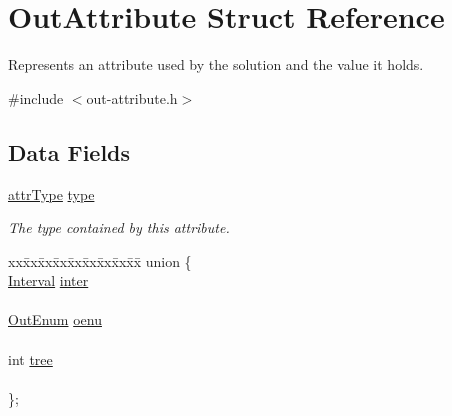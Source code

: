 \hypertarget{struct_out_attribute}{}\section{Out\+Attribute Struct Reference}
\label{struct_out_attribute}


Represents an attribute used by the solution and the value it holds.  




{\ttfamily \#include $<$out-\/attribute.\+h$>$}

\subsection*{Data Fields}
\begin{DoxyCompactItemize}
\item 
\hyperlink{attribute-types_8h_a1d7db01768b8c6ad96eb92c7f6a30f1b}{attr\+Type} \hyperlink{struct_out_attribute_a88721cff203fdfc8fcd285540041557f}{type}\hypertarget{struct_out_attribute_a88721cff203fdfc8fcd285540041557f}{}\label{struct_out_attribute_a88721cff203fdfc8fcd285540041557f}

\begin{DoxyCompactList}\small\item\em The type contained by this attribute. \end{DoxyCompactList}\item 
\begin{tabbing}
xx\=xx\=xx\=xx\=xx\=xx\=xx\=xx\=xx\=\kill
union \{\\
\>\hyperlink{struct_interval}{Interval} \hyperlink{struct_out_attribute_ad06263baef5945b27d0454c1f4c0610c}{inter}\\
\>\\
\>\hyperlink{struct_out_enum}{OutEnum} \hyperlink{struct_out_attribute_a4225b965bbcb80c0ee54c3724df694bb}{oenu}\\
\>\\
\>int \hyperlink{struct_out_attribute_aa3265047047fe57a6b51bb3bcf2e3138}{tree}\\
\>\\
\}; \hypertarget{struct_out_attribute_a246e6bd9c6af8abde651c0c239d54cc5}{}\label{struct_out_attribute_a246e6bd9c6af8abde651c0c239d54cc5}
\\

\end{tabbing}\end{DoxyCompactItemize}


